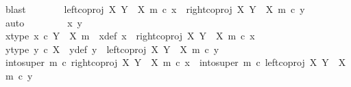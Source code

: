 \begin{isabellebody}
\ blast\isanewline
\ \ \ \ \isamarkupfalse%
\ \isamarkupfalse%
\ {\isachardoublequoteopen}left{\isacharunderscore}{\kern0pt}coproj\ X\ {\isacharparenleft}{\kern0pt}Y\ {\isasymsetminus}\ {\isacharparenleft}{\kern0pt}X{\isacharcomma}{\kern0pt}\ m{\isacharparenright}{\kern0pt}{\isacharparenright}{\kern0pt}\ {\isasymcirc}\isactrlsub c\ x{\isacharprime}{\kern0pt}\ {\isacharequal}{\kern0pt}\ right{\isacharunderscore}{\kern0pt}coproj\ X\ {\isacharparenleft}{\kern0pt}Y\ {\isasymsetminus}\ {\isacharparenleft}{\kern0pt}X{\isacharcomma}{\kern0pt}\ m{\isacharparenright}{\kern0pt}{\isacharparenright}{\kern0pt}\ {\isasymcirc}\isactrlsub c\ y{\isacharprime}{\kern0pt}{\isachardoublequoteclose}\isanewline
\ \ \ \ \ \ \isamarkupfalse%
\ auto\isanewline
\ \ \isamarkupfalse%
\isanewline
\ \ \ \ \isamarkupfalse%
\ x{\isacharprime}{\kern0pt}\ y{\isacharprime}{\kern0pt}\isanewline
\ \ \ \ \isamarkupfalse%
\ x{\isacharprime}{\kern0pt}{\isacharunderscore}{\kern0pt}type{\isacharcolon}{\kern0pt}\ {\isachardoublequoteopen}x{\isacharprime}{\kern0pt}\ {\isasymin}\isactrlsub c\ Y\ {\isasymsetminus}\ {\isacharparenleft}{\kern0pt}X{\isacharcomma}{\kern0pt}\ m{\isacharparenright}{\kern0pt}{\isachardoublequoteclose}\ \ x{\isacharunderscore}{\kern0pt}def{\isacharcolon}{\kern0pt}\ {\isachardoublequoteopen}x\ {\isacharequal}{\kern0pt}\ right{\isacharunderscore}{\kern0pt}coproj\ X\ {\isacharparenleft}{\kern0pt}Y\ {\isasymsetminus}\ {\isacharparenleft}{\kern0pt}X{\isacharcomma}{\kern0pt}\ m{\isacharparenright}{\kern0pt}{\isacharparenright}{\kern0pt}\ {\isasymcirc}\isactrlsub c\ x{\isacharprime}{\kern0pt}{\isachardoublequoteclose}\isanewline
\ \ \ \ \isamarkupfalse%
\ y{\isacharprime}{\kern0pt}{\isacharunderscore}{\kern0pt}type{\isacharcolon}{\kern0pt}\ {\isachardoublequoteopen}y{\isacharprime}{\kern0pt}\ {\isasymin}\isactrlsub c\ X{\isachardoublequoteclose}\ \ y{\isacharunderscore}{\kern0pt}def{\isacharcolon}{\kern0pt}\ {\isachardoublequoteopen}y\ {\isacharequal}{\kern0pt}\ left{\isacharunderscore}{\kern0pt}coproj\ X\ {\isacharparenleft}{\kern0pt}Y\ {\isasymsetminus}\ {\isacharparenleft}{\kern0pt}X{\isacharcomma}{\kern0pt}\ m{\isacharparenright}{\kern0pt}{\isacharparenright}{\kern0pt}\ {\isasymcirc}\isactrlsub c\ y{\isacharprime}{\kern0pt}{\isachardoublequoteclose}\isanewline
\isanewline
\ \ \ \ \isamarkupfalse%
\ {\isachardoublequoteopen}into{\isacharunderscore}{\kern0pt}super\ m\ {\isasymcirc}\isactrlsub c\ right{\isacharunderscore}{\kern0pt}coproj\ X\ {\isacharparenleft}{\kern0pt}Y\ {\isasymsetminus}\ {\isacharparenleft}{\kern0pt}X{\isacharcomma}{\kern0pt}\ m{\isacharparenright}{\kern0pt}{\isacharparenright}{\kern0pt}\ {\isasymcirc}\isactrlsub c\ x{\isacharprime}{\kern0pt}\ {\isacharequal}{\kern0pt}\ into{\isacharunderscore}{\kern0pt}super\ m\ {\isasymcirc}\isactrlsub c\ left{\isacharunderscore}{\kern0pt}coproj\ X\ {\isacharparenleft}{\kern0pt}Y\ {\isasymsetminus}\ {\isacharparenleft}{\kern0pt}X{\isacharcomma}{\kern0pt}\ m{\isacharparenright}{\kern0pt}{\isacharparenright}{\kern0pt}\ {\isasymcirc}\isactrlsub c\ y{\isacharprime}{\kern0pt}{\isachardoublequoteclose}\isanewline

\end{isabellebody}
